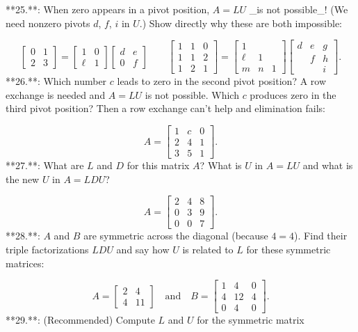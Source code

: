 

**25.**: When zero appears in a pivot position, \(A=LU\) _is not possible_! (We need nonzero pivots \(d\), \(f\), \(i\) in \(U\).) Show directly why these are both impossible:

\[\begin{bmatrix}0&1\\ 2&3\end{bmatrix}=\begin{bmatrix}1&0\\ \ell&1\end{bmatrix}\begin{bmatrix}d&e\\ 0&f\end{bmatrix}\qquad\begin{bmatrix}1&1&0\\ 1&1&2\\ 1&2&1\end{bmatrix}=\begin{bmatrix}1&&\\ \ell&1&\\ m&n&1\end{bmatrix}\begin{bmatrix}d&e&g\\ &f&h\\ &&i\end{bmatrix}.\]
**26.**: Which number \(c\) leads to zero in the second pivot position? A row exchange is needed and \(A=LU\) is not possible. Which \(c\) produces zero in the third pivot position? Then a row exchange can't help and elimination fails:

\[A=\begin{bmatrix}1&c&0\\ 2&4&1\\ 3&5&1\end{bmatrix}.\]
**27.**: What are \(L\) and \(D\) for this matrix \(A\)? What is \(U\) in \(A=LU\) and what is the new \(U\) in \(A=LDU\)?

\[A=\begin{bmatrix}2&4&8\\ 0&3&9\\ 0&0&7\end{bmatrix}.\]
**28.**: \(A\) and \(B\) are symmetric across the diagonal (because \(4=4\)). Find their triple factorizations \(LDU\) and say how \(U\) is related to \(L\) for these symmetric matrices:

\[A=\begin{bmatrix}2&4\\ 4&11\end{bmatrix}\quad\text{and}\quad B=\begin{bmatrix}1&4&0\\ 4&12&4\\ 0&4&0\end{bmatrix}.\]
**29.**: (Recommended) Compute \(L\) and \(U\) for the symmetric matrix

